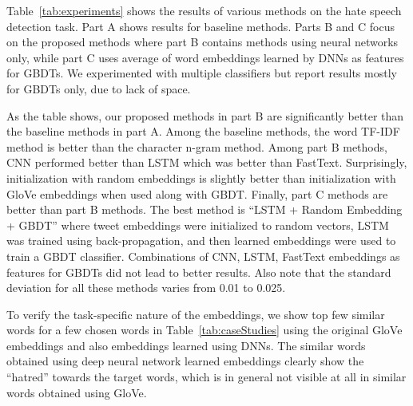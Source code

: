 \documentclass[letterpaper]{sig-alternate-2013}
\begin{document}
Table~\ref{tab:experiments} shows the results of various methods on the hate speech detection task. Part A shows results for baseline methods. Parts B and C focus on the proposed methods where part B contains methods using neural networks only, while part C uses average of word embeddings learned by DNNs as features for GBDTs. We experimented with multiple classifiers but report results mostly for GBDTs only, due to lack of space. 

As the table shows, our proposed methods in part B are significantly better than the baseline methods in part A. Among the baseline methods, the word TF-IDF method is better than the character n-gram method. Among part B methods, CNN performed better than LSTM which was better than FastText. Surprisingly, initialization with random embeddings is slightly better than initialization with GloVe embeddings when used along with GBDT. Finally, part C methods are better than part B methods. The best method is ``LSTM + Random Embedding + GBDT'' where tweet embeddings were initialized to random vectors, LSTM was trained using back-propagation, and then learned embeddings were used to train a GBDT classifier. Combinations of CNN, LSTM, FastText embeddings as features for GBDTs did not lead to better results. Also note that the standard deviation for all these methods varies from 0.01 to 0.025. 

To verify the task-specific nature of the embeddings, we show top few similar words for a few chosen words in Table~\ref{tab:caseStudies} using the original GloVe embeddings and also embeddings learned using DNNs. The similar words obtained using deep neural network learned embeddings clearly show the ``hatred'' towards the target words, which is in general not visible at all in similar words obtained using GloVe.
\end{document}
